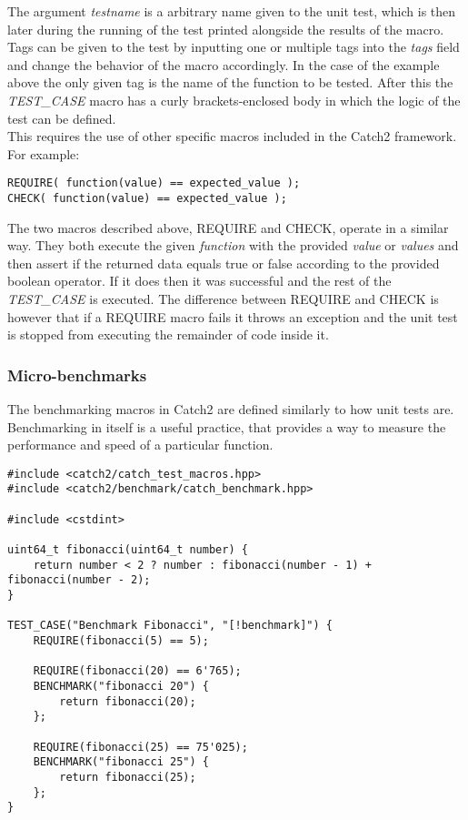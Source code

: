 The argument \textit{testname} is a arbitrary name given to the unit test, which is then later during the running of the test printed alongside the results of the macro.
Tags can be given to the test by inputting one or multiple tags into the \textit{tags} field and change the behavior of the macro accordingly. In the case of the example above
the only given tag is the name of the function to be tested. After this the \textit{TEST\_CASE} macro has a curly brackets-enclosed body in which the logic of the test can 
be defined.\\
This requires the use of other specific macros included in the Catch2 framework. For example:

\begin{verbatim}
REQUIRE( function(value) == expected_value );
CHECK( function(value) == expected_value );
\end{verbatim}

The two macros described above, REQUIRE and CHECK, operate in a similar way. They both execute the given \textit{function} with the provided \textit{value} or \textit{values}
and then assert if the returned data equals true or false according to the provided boolean operator. If it does then it was successful and the rest of the \textit{TEST\_CASE} is executed. The difference 
between REQUIRE and CHECK is however that if a REQUIRE macro fails it throws an exception and the unit test is stopped from executing the remainder of code inside it.

\subsubsection{Micro-benchmarks}
The benchmarking macros in Catch2 are defined similarly to how unit tests are. Benchmarking in itself is a useful practice, that provides a way to measure the performance
and speed of a particular function.

\begin{verbatim}
#include <catch2/catch_test_macros.hpp>
#include <catch2/benchmark/catch_benchmark.hpp>

#include <cstdint>

uint64_t fibonacci(uint64_t number) {
    return number < 2 ? number : fibonacci(number - 1) + fibonacci(number - 2);
}

TEST_CASE("Benchmark Fibonacci", "[!benchmark]") {
    REQUIRE(fibonacci(5) == 5);

    REQUIRE(fibonacci(20) == 6'765);
    BENCHMARK("fibonacci 20") {
        return fibonacci(20);
    };

    REQUIRE(fibonacci(25) == 75'025);
    BENCHMARK("fibonacci 25") {
        return fibonacci(25);
    };
}
\end{verbatim}

